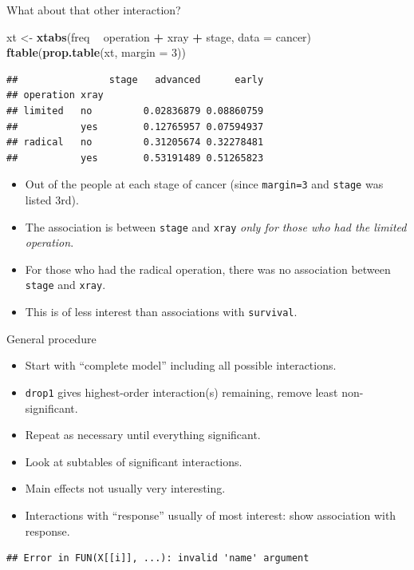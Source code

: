 \documentclass[ignorenonframetext,]{beamer}
\newenvironment{Shaded}{\begin{snugshade}}{\end{snugshade}}
\newcommand{\DataTypeTok}[1]{\textcolor[rgb]{0.13,0.29,0.53}{#1}}
\newcommand{\DecValTok}[1]{\textcolor[rgb]{0.00,0.00,0.81}{#1}}
\newcommand{\KeywordTok}[1]{\textcolor[rgb]{0.13,0.29,0.53}{\textbf{#1}}}
\newcommand{\NormalTok}[1]{#1}
\newcommand{\OperatorTok}[1]{\textcolor[rgb]{0.81,0.36,0.00}{\textbf{#1}}}
\newcommand{\StringTok}[1]{\textcolor[rgb]{0.31,0.60,0.02}{#1}}
\begin{document}
\begin{frame}[fragile]{What about that other interaction?}
\protect\hypertarget{what-about-that-other-interaction}{}

\begin{Shaded}
\begin{Highlighting}[]
\NormalTok{xt <-}\StringTok{ }\KeywordTok{xtabs}\NormalTok{(freq }\OperatorTok{~}\StringTok{ }\NormalTok{operation }\OperatorTok{+}\StringTok{ }\NormalTok{xray }\OperatorTok{+}\StringTok{ }\NormalTok{stage, }\DataTypeTok{data =}\NormalTok{ cancer)}
\KeywordTok{ftable}\NormalTok{(}\KeywordTok{prop.table}\NormalTok{(xt, }\DataTypeTok{margin =} \DecValTok{3}\NormalTok{))}
\end{Highlighting}
\end{Shaded}

\begin{verbatim}
##                stage   advanced      early
## operation xray                            
## limited   no         0.02836879 0.08860759
##           yes        0.12765957 0.07594937
## radical   no         0.31205674 0.32278481
##           yes        0.53191489 0.51265823
\end{verbatim}

\begin{itemize}
\item
  Out of the people at each stage of cancer (since \texttt{margin=3} and
  \texttt{stage} was listed 3rd).
\item
  The association is between \texttt{stage} and \texttt{xray} \emph{only
  for those who had the limited operation}.
\item
  For those who had the radical operation, there was no association
  between \texttt{stage} and \texttt{xray}.
\item
  This is of less interest than associations with \texttt{survival}.
\end{itemize}

\end{frame}

\begin{frame}[fragile]{General procedure}
\protect\hypertarget{general-procedure}{}

\begin{itemize}
\item
  Start with ``complete model'' including all possible interactions.
\item
  \texttt{drop1} gives highest-order interaction(s) remaining, remove
  least non-significant.
\item
  Repeat as necessary until everything significant.
\item
  Look at subtables of significant interactions.
\item
  Main effects not usually very interesting.
\item
  Interactions with ``response'' usually of most interest: show
  association with response.
\end{itemize}

\begin{verbatim}
## Error in FUN(X[[i]], ...): invalid 'name' argument
\end{verbatim}

\end{frame}
\end{document}
